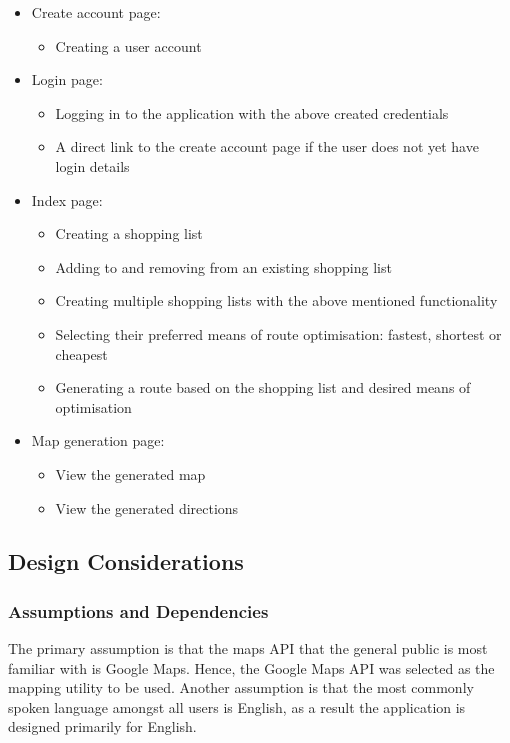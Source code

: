 \documentclass[10pt,twocolumn]{witseiepaper}
\begin{document}
		\begin{itemize}
			\item Create account page:
			\begin{itemize}
				\item Creating a user account
			\end{itemize}
			\item Login page:
			\begin{itemize}
				\item Logging in to the application with the above created credentials
				\item A direct link to the create account page if the user does not yet have login details
			\end{itemize}
			\item Index page:
			\begin{itemize}
				\item Creating a shopping list
				\item Adding to and removing from an existing shopping list
				\item Creating multiple shopping lists with the above mentioned functionality
				\item Selecting their preferred means of route optimisation: fastest, shortest or cheapest
				\item Generating a route based on the shopping list and desired means of optimisation
			\end{itemize}
			\item Map generation page:
			\begin{itemize}
				\item View the generated map
				\item View the generated directions
			\end{itemize}
		\end{itemize}
	
	\subsection{Design Considerations}
	
		\subsubsection{Assumptions and Dependencies}
		
			The primary assumption is that the maps API that the general public is most familiar with is Google Maps. Hence, the Google Maps API was selected as the mapping utility to be used. Another assumption is that the most commonly spoken language amongst all users is English, as a result the application is designed primarily for English. \\
			
\end{document}
